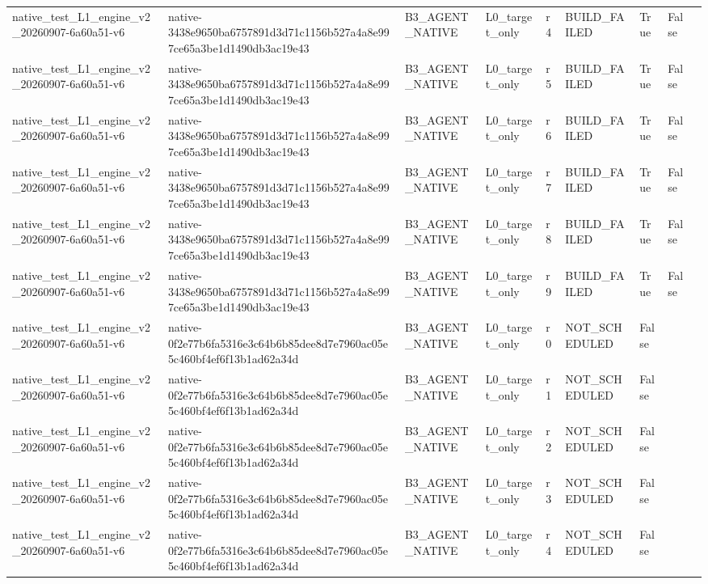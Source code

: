 \begin{tabular}{lllllllll}
native\_test\_L1\_engine\_v2\_20260907-6a60a51-v6 & native-3438e9650ba6757891d3d71c1156b527a4a8e997ce65a3be1d1490db3ac19e43 & B3\_AGENT\_NATIVE & L0\_target\_only & r4 & BUILD\_FAILED & True & False &  \\
native\_test\_L1\_engine\_v2\_20260907-6a60a51-v6 & native-3438e9650ba6757891d3d71c1156b527a4a8e997ce65a3be1d1490db3ac19e43 & B3\_AGENT\_NATIVE & L0\_target\_only & r5 & BUILD\_FAILED & True & False &  \\
native\_test\_L1\_engine\_v2\_20260907-6a60a51-v6 & native-3438e9650ba6757891d3d71c1156b527a4a8e997ce65a3be1d1490db3ac19e43 & B3\_AGENT\_NATIVE & L0\_target\_only & r6 & BUILD\_FAILED & True & False &  \\
native\_test\_L1\_engine\_v2\_20260907-6a60a51-v6 & native-3438e9650ba6757891d3d71c1156b527a4a8e997ce65a3be1d1490db3ac19e43 & B3\_AGENT\_NATIVE & L0\_target\_only & r7 & BUILD\_FAILED & True & False &  \\
native\_test\_L1\_engine\_v2\_20260907-6a60a51-v6 & native-3438e9650ba6757891d3d71c1156b527a4a8e997ce65a3be1d1490db3ac19e43 & B3\_AGENT\_NATIVE & L0\_target\_only & r8 & BUILD\_FAILED & True & False &  \\
native\_test\_L1\_engine\_v2\_20260907-6a60a51-v6 & native-3438e9650ba6757891d3d71c1156b527a4a8e997ce65a3be1d1490db3ac19e43 & B3\_AGENT\_NATIVE & L0\_target\_only & r9 & BUILD\_FAILED & True & False &  \\
native\_test\_L1\_engine\_v2\_20260907-6a60a51-v6 & native-0f2e77b6fa5316e3c64b6b85dee8d7e7960ac05e5c460bf4ef6f13b1ad62a34d & B3\_AGENT\_NATIVE & L0\_target\_only & r0 & NOT\_SCHEDULED & False &  &  \\
native\_test\_L1\_engine\_v2\_20260907-6a60a51-v6 & native-0f2e77b6fa5316e3c64b6b85dee8d7e7960ac05e5c460bf4ef6f13b1ad62a34d & B3\_AGENT\_NATIVE & L0\_target\_only & r1 & NOT\_SCHEDULED & False &  &  \\
native\_test\_L1\_engine\_v2\_20260907-6a60a51-v6 & native-0f2e77b6fa5316e3c64b6b85dee8d7e7960ac05e5c460bf4ef6f13b1ad62a34d & B3\_AGENT\_NATIVE & L0\_target\_only & r2 & NOT\_SCHEDULED & False &  &  \\
native\_test\_L1\_engine\_v2\_20260907-6a60a51-v6 & native-0f2e77b6fa5316e3c64b6b85dee8d7e7960ac05e5c460bf4ef6f13b1ad62a34d & B3\_AGENT\_NATIVE & L0\_target\_only & r3 & NOT\_SCHEDULED & False &  &  \\
native\_test\_L1\_engine\_v2\_20260907-6a60a51-v6 & native-0f2e77b6fa5316e3c64b6b85dee8d7e7960ac05e5c460bf4ef6f13b1ad62a34d & B3\_AGENT\_NATIVE & L0\_target\_only & r4 & NOT\_SCHEDULED & False &  &  \\

\end{tabular}

